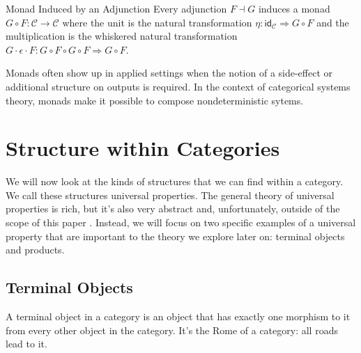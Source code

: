 \documentclass[12pt]{article}
\newcounter{examp}
\begin{document}
\begin{definition}{Monad Induced by an Adjunction}{}
  Every adjunction $F \dashv G$ induces a monad $G \circ F: \mathcal{C} \rightarrow \mathcal{C}$ where the unit is the natural transformation $\eta : \mathsf{id}_\mathcal{C} \Rightarrow G \circ F$ and the multiplication is the whiskered natural transformation $G \cdot \epsilon \cdot F: G \circ F \circ G \circ F \Rightarrow G \circ F$.
\end{definition}

Monads often show up in applied settings when the notion of a side-effect or additional structure on outputs is required.
In the context of categorical systems theory, monads make it possible to compose nondeterministic sytems.










\section*{Structure within Categories}

We will now look at the kinds of structures that we can find within a category.
We call these structures universal properties.
The general theory of universal properties is rich, but it's also very abstract and, unfortunately, outside of the scope of this paper \cite{riehl2017category}.
Instead, we will focus on two specific examples of a universal property that are important to the theory we explore later on: terminal objects and products.

\subsection*{Terminal Objects}
A terminal object in a category is an object that has exactly one morphism to it from every other object in the category.
It's the Rome of a category: all roads lead to it.
\end{document}
